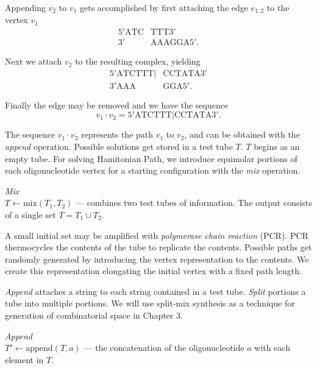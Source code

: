 \noindent Appending $v_2$ to $v_1$ gets accomplished by first attaching the edge $e_{1,2}$ to the vertex $v_1$
\begin{align*}
 5'\text{ATC}&\text{TTT}3' \\
  3'&\text{AAAGGA}5'.
\end{align*}

\noindent Next we attach $v_2$ to the resulting complex, yielding
\begin{align*}
 5'\text{ATCTTT}|&\text{CCTATA}3'\\
  3'\text{AAA}&\text{GGA}5'.
\end{align*}

\noindent Finally the edge may be removed and we have the sequence
\[
v_1 \cdot v_2 = 5'\text{ATCTTT}|\text{CCTATA}3'.
\]

The sequence $v_1 \cdot v_2$ represents the path $v_1$ to $v_2$, and can be obtained with the \textit{append} operation.  Possible solutions get stored in a test tube $T$.  $T$ begins as an empty tube.  For solving {\sc Hamitonian Path}, we introduce equimolar portions of each oligonucleotide vertex for a starting configuration with the \textit{mix} operation.

\begin{definition}
\textit{Mix}\\
$ T \leftarrow \text{mix}( T_1, T_2)$ --- combines two test tubes of information.  The output consists of a single set $T = T_1 \cup T_2$.
\end{definition}

A small initial set may be amplified with \textit{polymerase chain reaction} (PCR).  PCR thermocycles the contents of the tube to replicate the contents. Possible paths get randomly generated by introducing the vertex representation to the contents.  We create this representation elongating the initial vertex with a fixed path length.

\textit{Append} attaches a string to each string contained in a test tube.  \textit{Split} portions a tube into multiple portions.  We will use split-mix synthesis as a technique for generation of combinatorial space in Chapter 3.

\begin{definition}
\textit{Append}\\
$T' \leftarrow \text{append}( T, a)$ --- the concatenation of the oligonucleotide $a$ with each element in $T$.  
\end{definition}

